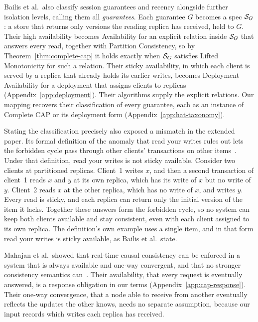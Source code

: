 Bailis et al.\ also classify session guarantees and recency alongside further
isolation levels, calling them all \emph{guarantees}.  Each guarantee $G$
becomes a spec $\mathcal{S}_G$: a store that returns only versions the reading
replica has received, held to $G$.  Their high availability becomes
Availability for an explicit relation inside $\mathcal{S}_G$ that answers every read,
together with Partition Consistency, so by Theorem~\ref{thm:complete-cap} it
holds exactly when $\mathcal{S}_G$ satisfies Lifted Monotonicity for such a relation.
Their sticky availability, in which each client is served by a replica that
already holds its earlier writes, becomes Deployment Availability for a
deployment that assigns clients to replicas
(Appendix~\ref{app:deployment}).  Their algorithms supply the
explicit relations.  Our mapping recovers their classification of every
guarantee, each as an instance of Complete CAP or its deployment form
(Appendix~\ref{app:hat-taxonomy}).

Stating the classification precisely also exposed a mismatch in the extended
paper.  Its formal definition of the anomaly that read your writes rules out
lets the forbidden cycle pass through other clients' transactions on other
items~\cite[Def.~34]{bailis2013hatextended}.  Under that definition, read your
writes is not sticky available.  Consider two clients at partitioned replicas.
Client~1 writes $x$, and then a second transaction of client~1 reads $x$ and
$y$ at its own replica, which has its write of $x$ but no write of $y$.
Client~2 reads $x$ at the other replica, which has no write of $x$, and writes
$y$.  Every read is sticky, and each replica can return only the initial
version of the item it lacks.  Together these answers form the forbidden
cycle, so no system can keep both clients available and stay consistent, even
with each client assigned to its own replica.  The definition's own example
uses a single item, and in that form read your writes is sticky available, as
Bailis et al.\ state.

Mahajan et al.\ showed that real-time causal consistency can be enforced in a
system that is always available and one-way convergent, and that no stronger
consistency semantics can~\cite{mahajan2011consistency}.  Their availability,
that every request is eventually answered, is a response obligation in our
terms (Appendix~\ref{app:cap-response}).  Their one-way convergence, that a
node able to receive from another eventually reflects the updates the other
knows, needs no separate assumption, because our input records which writes
each replica has received.


